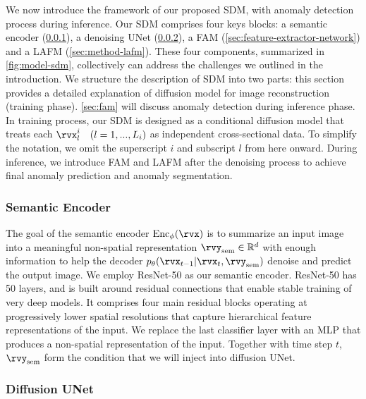 We now introduce the framework of our proposed SDM, with anomaly detection process during inference. Our SDM comprises four keys blocks: a semantic encoder (\cref{sec:method-semantic-encoder}), a denoising UNet (\cref{sec:method-unet}), a \ac{FAM} (\cref{sec:feature-extractor-network}) and a \ac{LAFM} (\cref{sec:method-lafm}). These four components, summarized in \cref{fig:model-sdm}, collectively can address the challenges we outlined in the introduction. We structure the description of SDM into two parts: this section provides a detailed explanation of diffusion model for image reconstruction (training phase). \cref{sec:fam} will discuss anomaly detection during inference phase. In training process, our SDM is designed as a conditional diffusion model that treats each $\rvx^i_l \quad (l = 1, ..., L_i)$ as independent cross-sectional data. To simplify the notation, we omit the superscript $i$ and subscript $l$ from here onward. During inference, we introduce \ac{FAM} and \ac{LAFM} after the denoising process to achieve final anomaly prediction and anomaly segmentation. 

\subsubsection{Semantic Encoder}
\label{sec:method-semantic-encoder}

The goal of the semantic encoder $\mathrm{Enc}_\phi(\rvx)$ is to summarize an input image into a meaningful non-spatial representation $\rvy_{\text{sem}} \in \mathbb{R}^d$ with enough information to help the decoder $p_\theta(\rvx_{t - 1}|\rvx_t, \rvy_{\text{sem}})$ denoise and predict the output image. We employ ResNet-50 \cite{ResNet50} as our semantic encoder. ResNet-50 has 50 layers, and is built around residual connections that enable stable training of very deep models. It comprises four main residual blocks operating at progressively lower spatial resolutions that capture hierarchical feature representations of the input. We replace the last classifier layer with an MLP that produces a non-spatial representation of the input. Together with time step $t$, $\rvy_{\text{sem}}$ form the condition that we will inject into diffusion UNet. 

\subsubsection{Diffusion UNet}
\label{sec:method-unet}

